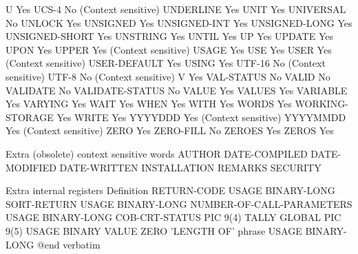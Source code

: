 U                               Yes
UCS-4                           No (Context sensitive)
UNDERLINE                       Yes
UNIT                            Yes
UNIVERSAL                       No
UNLOCK                          Yes
UNSIGNED                        Yes
UNSIGNED-INT                    Yes
UNSIGNED-LONG                   Yes
UNSIGNED-SHORT                  Yes
UNSTRING                        Yes
UNTIL                           Yes
UP                              Yes
UPDATE                          Yes
UPON                            Yes
UPPER                           Yes (Context sensitive)
USAGE                           Yes
USE                             Yes
USER                            Yes (Context sensitive)
USER-DEFAULT                    Yes
USING                           Yes
UTF-16                          No (Context sensitive)
UTF-8                           No (Context sensitive)
V                               Yes
VAL-STATUS                      No
VALID                           No
VALIDATE                        No
VALIDATE-STATUS                 No
VALUE                           Yes
VALUES                          Yes
VARIABLE                        Yes
VARYING                         Yes
WAIT                            Yes
WHEN                            Yes
WITH                            Yes
WORDS                           Yes
WORKING-STORAGE                 Yes
WRITE                           Yes
YYYYDDD                         Yes (Context sensitive)
YYYYMMDD                        Yes (Context sensitive)
ZERO                            Yes
ZERO-FILL                       No
ZEROES                          Yes
ZEROS                           Yes

Extra (obsolete) context sensitive words
AUTHOR
DATE-COMPILED
DATE-MODIFIED
DATE-WRITTEN
INSTALLATION
REMARKS
SECURITY

Extra internal registers        Definition
RETURN-CODE                     USAGE BINARY-LONG
SORT-RETURN                     USAGE BINARY-LONG
NUMBER-OF-CALL-PARAMETERS       USAGE BINARY-LONG
COB-CRT-STATUS                  PIC 9(4)
TALLY                           GLOBAL PIC 9(5) USAGE BINARY VALUE ZERO
'LENGTH OF' phrase              USAGE BINARY-LONG
@end verbatim

